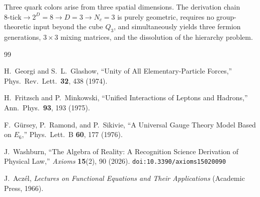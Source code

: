 \documentclass[12pt,a4paper]{article}
\theoremstyle{definition}
\theoremstyle{remark}
\begin{document}
Three quark colors arise from three spatial dimensions.  The derivation
chain $8\text{-tick} \to 2^D = 8 \to D = 3 \to N_c = 3$ is purely
geometric, requires no group-theoretic input beyond the cube $Q_3$,
and simultaneously yields three fermion generations, $3 \times 3$
mixing matrices, and the dissolution of the hierarchy problem.  
\begin{thebibliography}{99}

H.~Georgi and S.~L.~Glashow, ``Unity of All Elementary-Particle
Forces,'' Phys.\ Rev.\ Lett.\ \textbf{32}, 438 (1974).

H.~Fritzsch and P.~Minkowski, ``Unified Interactions of Leptons and
Hadrons,'' Ann.\ Phys.\ \textbf{93}, 193 (1975).

F.~G\"ursey, P.~Ramond, and P.~Sikivie, ``A Universal Gauge Theory
Model Based on $E_6$,'' Phys.\ Lett.\ B \textbf{60}, 177 (1976).

J.~Washburn, ``The Algebra of Reality: A Recognition Science Derivation
of Physical Law,'' \emph{Axioms} \textbf{15}(2), 90 (2026).
\texttt{doi:10.3390/axioms15020090}

J.~Acz\'el, \emph{Lectures on Functional Equations and Their
Applications} (Academic Press, 1966).

\end{thebibliography}
\end{document}
